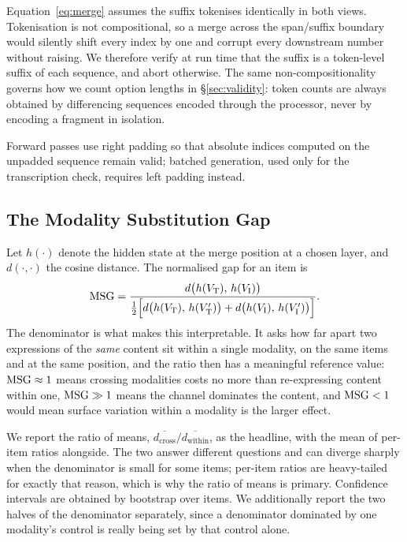 Equation~\ref{eq:merge} assumes the suffix tokenises identically in both views.
Tokenisation is not compositional, so a merge across the span/suffix boundary
would silently shift every index by one and corrupt every downstream number
without raising. We therefore verify at run time that the suffix is a token-level
suffix of each sequence, and abort otherwise. The same non-compositionality
governs how we count option lengths in \S\ref{sec:validity}: token counts are
always obtained by differencing sequences encoded through the processor, never
by encoding a fragment in isolation.

Forward passes use right padding so that absolute indices computed on the
unpadded sequence remain valid; batched generation, used only for the
transcription check, requires left padding instead.

\subsection{The Modality Substitution Gap}
\label{sec:msg}

Let $h(\cdot)$ denote the hidden state at the merge position at a chosen layer,
and $d(\cdot,\cdot)$ the cosine distance. The normalised gap for an item is
\begin{equation}
    \mathrm{MSG} = \frac{d\big(h(V_{\mathrm{T}}),\, h(V_{\mathrm{I}})\big)}
                {\tfrac{1}{2}\Big[d\big(h(V_{\mathrm{T}}),\, h(V_{\mathrm{T}}')\big)
                 + d\big(h(V_{\mathrm{I}}),\, h(V_{\mathrm{I}}')\big)\Big]}.
    \label{eq:msg}
\end{equation}
The denominator is what makes this interpretable. It asks how far apart two
expressions of the \emph{same} content sit within a single modality, on the same
items and at the same position, and the ratio then has a meaningful reference
value: $\mathrm{MSG} \approx 1$ means crossing modalities costs no more than
re-expressing content within one, $\mathrm{MSG} \gg 1$ means the channel dominates the
content, and $\mathrm{MSG} < 1$ would mean surface variation within a modality is the
larger effect.

We report the ratio of means, $\overline{d_{\text{cross}}}/\overline{d_{\text{within}}}$,
as the headline, with the mean of per-item ratios alongside. The two answer
different questions and can diverge sharply when the denominator is
small for some items; per-item ratios are heavy-tailed for exactly that reason,
which is why the ratio of means is primary. Confidence intervals are obtained by
bootstrap over items. We additionally report the two halves of the denominator
separately, since a denominator dominated by one modality's control is really
being set by that control alone.

